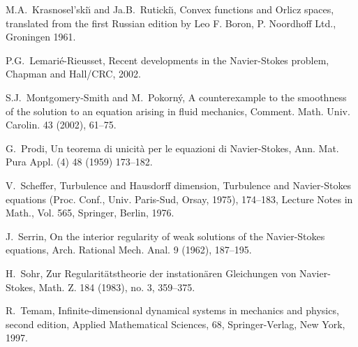 \documentclass[12pt]{amsart}
\theoremstyle{remark}
\begin{document}
\begin{thebibliography}{999}
M.A.~Krasnosel'ski{\u\i} and Ja.B.~Ruticki\u\i,
Convex functions and Orlicz spaces,
translated from the first Russian edition by Leo F. Boron, 
P. Noordhoff Ltd., 
Groningen 1961.

P.G.~Lemari\'e-Rieusset,
Recent developments in the Navier-Stokes problem,
Chapman and Hall/CRC, 2002.

S.J.~Montgomery-Smith and M.~Pokorn\'y,
A counterexample to the smoothness of the solution to an 
equation arising in fluid mechanics,
Comment. Math. Univ. Carolin.  43  (2002),  61--75.

G.~Prodi,
Un teorema di unicit\`a per le equazioni di Navier-Stokes,
Ann. Mat. Pura Appl. (4)  48  (1959) 173--182.

V.~Scheffer,
Turbulence and Hausdorff dimension, 
Turbulence and Navier-Stokes equations
(Proc. Conf., Univ. Paris-Sud, Orsay, 1975), 174--183,
Lecture Notes in Math., Vol. 565, Springer, Berlin, 1976. 

J.~Serrin,
On the interior regularity of weak solutions of the Navier-Stokes equations,
Arch. Rational Mech. Anal.  9  (1962), 187--195.

H.~Sohr,
Zur Regularit\"atstheorie der instation\"aren Gleichungen von Navier-Stokes, 
Math. Z.  184  (1983),  no. 3, 359--375.

R.~Temam,
Infinite-dimensional dynamical systems in mechanics and physics,
second edition, Applied Mathematical Sciences, 68,
Springer-Verlag, New York, 1997.

\end{thebibliography}
\end{document}
